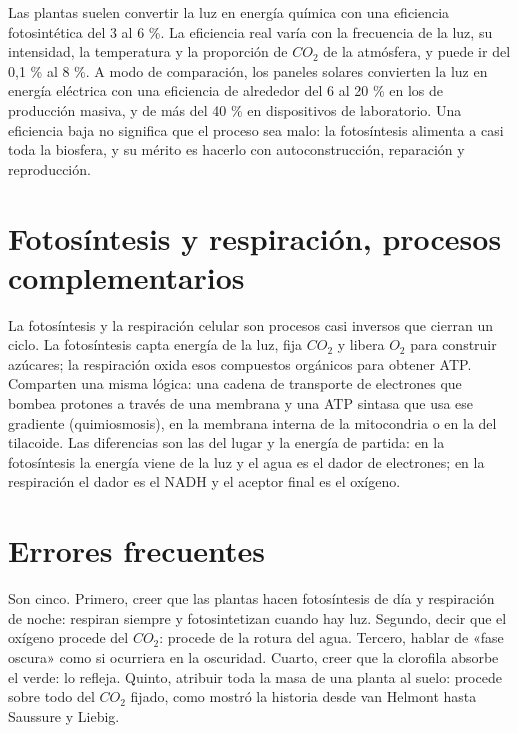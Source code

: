 \documentclass{book}
\begin{document}
Las plantas suelen convertir la luz en energía química con una eficiencia fotosintética del 3 al 6 \%. La eficiencia real varía con la frecuencia de la luz, su intensidad, la temperatura y la proporción de \(CO_{2}\) de la atmósfera, y puede ir del 0,1 \% al 8 \%. A modo de comparación, los paneles solares convierten la luz en energía eléctrica con una eficiencia de alrededor del 6 al 20 \% en los de producción masiva, y de más del 40 \% en dispositivos de laboratorio. Una eficiencia baja no significa que el proceso sea malo: la fotosíntesis alimenta a casi toda la biosfera, y su mérito es hacerlo con autoconstrucción, reparación y reproducción.


\section{Fotosíntesis y respiración, procesos complementarios}

La fotosíntesis y la respiración celular son procesos casi inversos que cierran un ciclo. La fotosíntesis capta energía de la luz, fija \(CO_{2}\) y libera \(O_{2}\) para construir azúcares; la respiración oxida esos compuestos orgánicos para obtener ATP. Comparten una misma lógica: una cadena de transporte de electrones que bombea protones a través de una membrana y una ATP sintasa que usa ese gradiente (quimiosmosis), en la membrana interna de la mitocondria o en la del tilacoide. Las diferencias son las del lugar y la energía de partida: en la fotosíntesis la energía viene de la luz y el agua es el dador de electrones; en la respiración el dador es el NADH y el aceptor final es el oxígeno.


\section{Errores frecuentes}

Son cinco. Primero, creer que las plantas hacen fotosíntesis de día y respiración de noche: respiran siempre y fotosintetizan cuando hay luz. Segundo, decir que el oxígeno procede del \(CO_{2}\): procede de la rotura del agua. Tercero, hablar de «fase oscura» como si ocurriera en la oscuridad. Cuarto, creer que la clorofila absorbe el verde: lo refleja. Quinto, atribuir toda la masa de una planta al suelo: procede sobre todo del \(CO_{2}\) fijado, como mostró la historia desde van Helmont hasta Saussure y Liebig.
\end{document}
